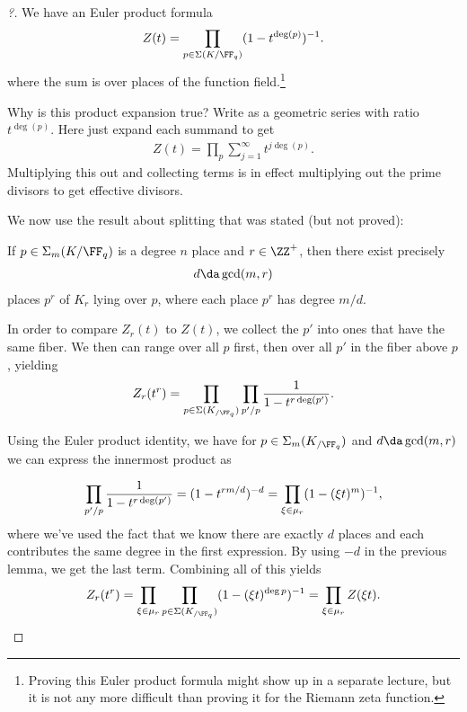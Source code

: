 \begin{proof}[?]

We have an Euler product formula
\begin{align*}  
Z(t) = \prod_{p\in \Sigma(K/\FF_q)} (1 - t^{\deg(p)})^{-1} 
.\end{align*} where the sum is over places of the function
field.\footnote{Proving this Euler product formula might show up in a
  separate lecture, but it is not any more difficult than proving it for
  the Riemann zeta function.}

\begin{exercise}

Why is this product expansion true? Write as a geometric series with
ratio \(t^{\deg(p)}\). Here just expand each summand to get
\begin{align*}  
Z(t) = \prod_p \sum_{j=1}^\infty t^{j\deg(p)}
.\end{align*} Multiplying this out and collecting terms is in effect
multiplying out the prime divisors to get effective divisors.

\end{exercise}

We now use the result about splitting that was stated (but not proved):

\begin{claim}

If \(p\in \Sigma_m(K/\FF_q)\) is a degree \(n\) place and
\(r\in \ZZ^+\), then there exist precisely
\begin{align*}
d\da \gcd(m, r)
\end{align*} places \(p^r\) of \(K_r\) lying over \(p\), where each
place \(p^r\) has degree \(m/d\).

\end{claim}

In order to compare \(Z_r(t)\) to \(Z(t)\), we collect the \(p'\) into
ones that have the same fiber. We then can range over all \(p\) first,
then over all \(p'\) in the fiber above \(p\), yielding
\begin{align*}  
Z_r(t^r) = \prod_{p\in \Sigma(K_{/\FF_q})} \prod_{p'/p} {1 \over 1 - t^{r\deg(p')}}
.\end{align*}

Using the Euler product identity, we have for
\(p\in \Sigma_m(K_{/\FF_q})\) and \(d\da \gcd(m, r)\) we can express the
innermost product as

\begin{align*}  
\prod_{p'/p} {1 \over 1 - t^{r\deg(p')}} = (1 - t^{rm/d})^{-d} = \prod_{\xi\in \mu_r} (1- (\xi t)^m)^{-1}
,\end{align*} where we've used the fact that we know there are exactly
\(d\) places and each contributes the same degree in the first
expression. By using \(-d\) in the previous lemma, we get the last term.
Combining all of this yields
\begin{align*}  
Z_r(t^r) 
= \prod_{\xi \in \mu_r} \prod_{p\in \Sigma(K_{/\FF_q})} (1- (\xi t)^{\deg p})^{-1} 
= \prod_{\xi \in \mu_r} Z(\xi t)
.\end{align*}

\end{proof}


